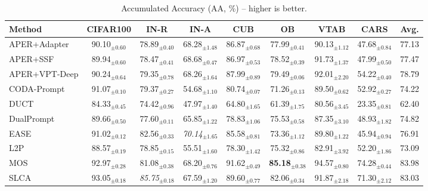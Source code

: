 \begin{table}[!t]
\begin{subtable}{\textwidth}
  \centering
  \caption{Accumulated Accuracy (AA, \%) -- higher is better.}
  \label{tab:overall-aa}
  \renewcommand{\arraystretch}{0.95}
\begin{adjustbox}{max width=\textwidth}
\footnotesize
\begin{tabular}{l c c c c c c c c}
\toprule
Method & \textbf{CIFAR100} & \textbf{IN-R} & \textbf{IN-A} & \textbf{CUB} & \textbf{OB} & \textbf{VTAB} & \textbf{CARS} & \textbf{Avg.} \\
\midrule
APER+Adapter & 90.10$_{\pm 0.60}$ & 78.89$_{\pm 0.40}$ & 68.28$_{\pm 1.48}$ & 86.87$_{\pm 0.68}$ & 77.99$_{\pm 0.41}$ & 90.13$_{\pm 1.12}$ & 47.68$_{\pm 0.84}$ & 77.13 \\
APER+SSF & 89.94$_{\pm 0.60}$ & 78.47$_{\pm 0.41}$ & 68.68$_{\pm 0.47}$ & 86.97$_{\pm 0.53}$ & 78.52$_{\pm 0.39}$ & 91.73$_{\pm 1.37}$ & 47.99$_{\pm 0.50}$ & 77.47 \\
APER+VPT-Deep & 90.24$_{\pm 0.64}$ & 79.35$_{\pm 0.78}$ & 68.26$_{\pm 1.64}$ & 87.99$_{\pm 0.89}$ & 79.49$_{\pm 0.06}$ & 92.01$_{\pm 2.20}$ & 54.22$_{\pm 0.40}$ & 78.79 \\
CODA-Prompt & 91.07$_{\pm 0.10}$ & 79.37$_{\pm 0.27}$ & 54.68$_{\pm 1.10}$ & 80.74$_{\pm 0.07}$ & 71.26$_{\pm 0.13}$ & 89.50$_{\pm 0.62}$ & 52.92$_{\pm 0.27}$ & 74.22 \\
DUCT & 84.33$_{\pm 0.45}$ & 74.42$_{\pm 0.96}$ & 47.97$_{\pm 1.40}$ & 64.80$_{\pm 1.65}$ & 61.39$_{\pm 1.75}$ & 80.56$_{\pm 3.45}$ & 23.35$_{\pm 0.81}$ & 62.40 \\
DualPrompt & 89.66$_{\pm 0.50}$ & 77.60$_{\pm 0.11}$ & 65.85$_{\pm 1.22}$ & 78.83$_{\pm 1.06}$ & 75.53$_{\pm 0.58}$ & 87.35$_{\pm 3.10}$ & 48.93$_{\pm 1.82}$ & 74.82 \\
EASE & 91.02$_{\pm 0.12}$ & 82.56$_{\pm 0.33}$ & \textit{70.14}$_{\pm 1.65}$ & 85.58$_{\pm 0.81}$ & 73.36$_{\pm 1.12}$ & 89.80$_{\pm 1.22}$ & 45.94$_{\pm 0.94}$ & 76.91 \\
L2P & 88.57$_{\pm 0.19}$ & 78.85$_{\pm 0.15}$ & 55.51$_{\pm 1.60}$ & 78.30$_{\pm 1.42}$ & 75.32$_{\pm 0.86}$ & 82.91$_{\pm 3.92}$ & 52.20$_{\pm 1.86}$ & 73.09 \\
MOS & 92.97$_{\pm 0.28}$ & 81.08$_{\pm 0.38}$ & 68.20$_{\pm 0.76}$ & 91.62$_{\pm 0.49}$ & \textbf{85.18}$_{\pm 0.38}$ & 94.57$_{\pm 0.80}$ & 74.28$_{\pm 0.44}$ & 83.98 \\
SLCA & 93.05$_{\pm 0.18}$ & \textit{85.75}$_{\pm 0.18}$ & 67.59$_{\pm 1.20}$ & 89.60$_{\pm 0.77}$ & 82.06$_{\pm 0.34}$ & 91.87$_{\pm 2.18}$ & 71.30$_{\pm 2.12}$ & 83.03 \\

\end{tabular}
\end{adjustbox}
\end{subtable}
\end{table}
